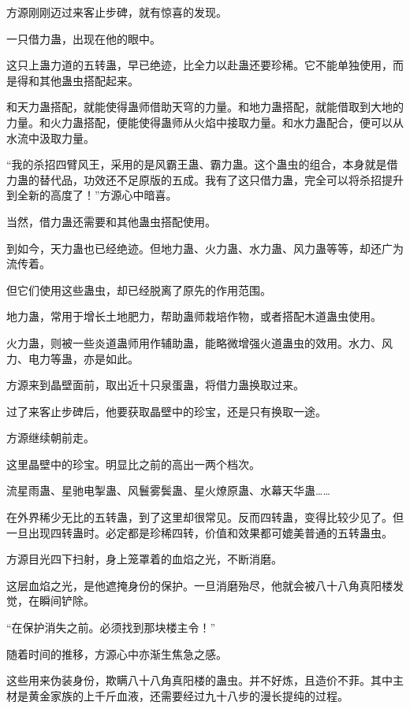 
\begin{this_body}

方源刚刚迈过来客止步碑，就有惊喜的发现。

一只借力蛊，出现在他的眼中。

这只上蛊力道的五转蛊，早已绝迹，比全力以赴蛊还要珍稀。它不能单独使用，而是得和其他蛊虫搭配起来。

和天力蛊搭配，就能使得蛊师借助天穹的力量。和地力蛊搭配，就能借取到大地的力量。和火力蛊搭配，便能使得蛊师从火焰中接取力量。和水力蛊配合，便可以从水流中汲取力量。

“我的杀招四臂风王，采用的是风霸王蛊、霸力蛊。这个蛊虫的组合，本身就是借力蛊的替代品，功效还不足原版的五成。我有了这只借力蛊，完全可以将杀招提升到全新的高度了！”方源心中暗喜。

当然，借力蛊还需要和其他蛊虫搭配使用。

到如今，天力蛊也已经绝迹。但地力蛊、火力蛊、水力蛊、风力蛊等等，却还广为流传着。

但它们使用这些蛊虫，却已经脱离了原先的作用范围。

地力蛊，常用于增长土地肥力，帮助蛊师栽培作物，或者搭配木道蛊虫使用。

火力蛊，则被一些炎道蛊师用作辅助蛊，能略微增强火道蛊虫的效用。水力、风力、电力等蛊，亦是如此。

方源来到晶壁面前，取出近十只泉蛋蛊，将借力蛊换取过来。

过了来客止步碑后，他要获取晶壁中的珍宝，还是只有换取一途。

方源继续朝前走。

这里晶壁中的珍宝。明显比之前的高出一两个档次。

流星雨蛊、星驰电掣蛊、风鬟雾鬓蛊、星火燎原蛊、水幕天华蛊……

在外界稀少无比的五转蛊，到了这里却很常见。反而四转蛊，变得比较少见了。但一旦出现四转蛊时。必定都是珍稀四转，价值和效果都可媲美普通的五转蛊虫。

方源目光四下扫射，身上笼罩着的血焰之光，不断消磨。

这层血焰之光，是他遮掩身份的保护。一旦消磨殆尽，他就会被八十八角真阳楼发觉，在瞬间铲除。

“在保护消失之前。必须找到那块楼主令！”

随着时间的推移，方源心中亦渐生焦急之感。

这些用来伪装身份，欺瞒八十八角真阳楼的蛊虫。并不好炼，且造价不菲。其中主材是黄金家族的上千斤血液，还需要经过九十八步的漫长提纯的过程。


\end{this_body}
